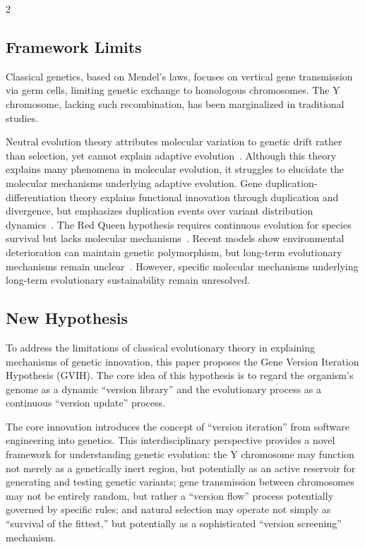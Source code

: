 \documentclass{base}
\begin{document}
\begin{multicols}{2}
\subsection{Framework Limits}
Classical genetics, based on Mendel's laws, focuses on vertical gene transmission via germ cells, limiting genetic exchange to homologous chromosomes. The Y chromosome, lacking such recombination, has been marginalized in traditional studies.

Neutral evolution theory attributes molecular variation to genetic drift rather than selection, yet cannot explain adaptive evolution~\cite{kimura_evolutionary_1968}. Although this theory explains many phenomena in molecular evolution, it struggles to elucidate the molecular mechanisms underlying adaptive evolution.
Gene duplication-differentiation theory explains functional innovation through duplication and divergence, but emphasizes duplication events over variant distribution dynamics~\cite{ohno_evolution_1970}.
The Red Queen hypothesis requires continuous evolution for species survival but lacks molecular mechanisms~\cite{strotz_getting_2018}.
Recent models show environmental deterioration can maintain genetic polymorphism, but long-term evolutionary mechanisms remain unclear~\cite{spencer_polymorphism_2024}.
However, specific molecular mechanisms underlying long-term evolutionary sustainability remain unresolved.

\subsection{New Hypothesis}
To address the limitations of classical evolutionary theory in explaining mechanisms of genetic innovation, this paper proposes the Gene Version Iteration Hypothesis (GVIH). The core idea of this hypothesis is to regard the organism's genome as a dynamic ``version library'' and the evolutionary process as a continuous ``version update'' process.

The core innovation introduces the concept of ``version iteration'' from software engineering into genetics. This interdisciplinary perspective provides a novel framework for understanding genetic evolution: the Y chromosome may function not merely as a genetically inert region, but potentially as an active reservoir for generating and testing genetic variants; gene transmission between chromosomes may not be entirely random, but rather a ``version flow'' process potentially governed by specific rules; and natural selection may operate not simply as ``survival of the fittest,'' but potentially as a sophisticated ``version screening'' mechanism.


\end{multicols}
\end{document}
